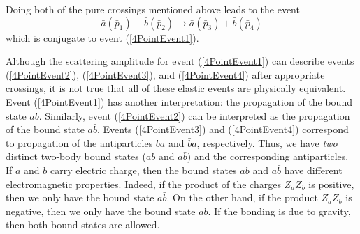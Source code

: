 Doing both of the pure crossings mentioned above leads to the event
\begin{equation}
	\bar{a}(\bar{p}_{1}) + \bar{b}(\bar{p}_{2}) \longrightarrow \bar{a}(\bar{p}_{3}) + 	\bar{b}(\bar{p}_{4}) \label{4PointEvent4}
\end{equation}
which is conjugate to event (\ref{4PointEvent1}).

Although the scattering amplitude for event (\ref{4PointEvent1}) can describe events (\ref{4PointEvent2}), (\ref{4PointEvent3}), and (\ref{4PointEvent4}) after appropriate crossings, it is not true that all of these elastic events are physically equivalent. Event (\ref{4PointEvent1}) has another interpretation: the propagation of the bound state $ab$. Similarly, event (\ref{4PointEvent2}) can be interpreted as the propagation of the bound state $a \bar{b}$. Events (\ref{4PointEvent3}) and (\ref{4PointEvent4}) correspond to propagation of the antiparticles $b\bar{a}$ and $\bar{b}\bar{a}$, respectively. Thus, we have \textit{two} distinct two-body bound states ($ab$ and $a \bar{b}$) and the corresponding antiparticles. If $a$ and $b$ carry electric charge, then the bound states $ab$ and $a \bar{b}$ have different electromagnetic properties. Indeed, if the product of the charges $Z_{a} Z_{b}$ is positive, then we only have the bound state $a \bar{b}$. On the other hand, if the product $Z_{a}Z_{b}$ is negative, then we only have the bound state $ab$. If the bonding is due to gravity, then both bound states are allowed.

